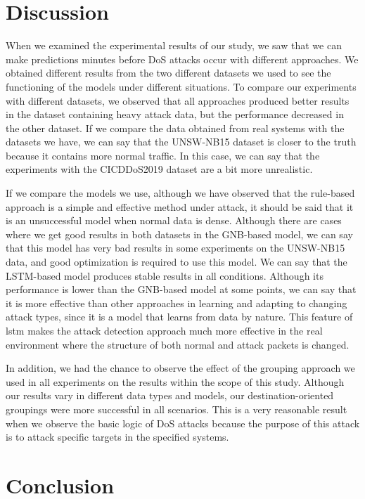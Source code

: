 \documentclass{article}
\begin{document}
\section{Discussion}

When we examined the experimental results of our study, we saw that we can make predictions minutes before DoS attacks occur with different approaches. We obtained different results from the two different datasets we used to see the functioning of the models under different situations. To compare our experiments with different datasets, we observed that all approaches produced better results in the dataset containing heavy attack data, but the performance decreased in the other dataset. If we compare the data obtained from real systems with the datasets we have, we can say that the UNSW-NB15 dataset is closer to the truth because it contains more normal traffic. In this case, we can say that the experiments with the CICDDoS2019 dataset are a bit more unrealistic. 

If we compare the models we use, although we have observed that the rule-based approach is a simple and effective method under attack, it should be said that it is an unsuccessful model when normal data is dense. Although there are cases where we get good results in both datasets in the GNB-based model, we can say that this model has very bad results in some experiments on the UNSW-NB15 data, and good optimization is required to use this model. We can say that the LSTM-based model produces stable results in all conditions. Although its performance is lower than the GNB-based model at some points, we can say that it is more effective than other approaches in learning and adapting to changing attack types, since it is a model that learns from data by nature. This feature of lstm makes the attack detection approach much more effective in the real environment where the structure of both normal and attack packets is changed.

In addition, we had the chance to observe the effect of the grouping approach we used in all experiments on the results within the scope of this study. Although our results vary in different data types and models, our destination-oriented groupings were more successful in all scenarios. This is a very reasonable result when we observe the basic logic of DoS attacks because the purpose of this attack is to attack specific targets in the specified systems.

\section{Conclusion}
\end{document}
